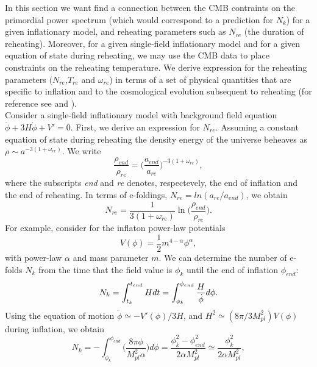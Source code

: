 \documentclass[11pt,a4paper,twoside]{book}
\begin{document}
In this section we want find a connection between the CMB contraints on the primordial power spectrum (which would correspond to a prediction for $ N_{k} $) for a given inflationary model, and reheating parameters such as $ N_{re} $ (the duration of reheating). Moreover, for a given single-field inflationary model and for a given equation of state during reheating, we may use the CMB data to place constraints on the reheating temperature. We derive expression for the reheating parameters $ (N_{re}$,$T_{re}$ and $ \omega_{re} $) in terms of a set of physical quantities that are specific to inflation and to the cosmological evolution subsequent to reheating (for reference see \cite{Chap3:Cook} and \cite{Chap3:Kai_Kamionkowsy}).\\
 Consider a single-field inflationary model with background field equation $ \ddot{\phi}+3H\dot{\phi} + V'=0 $. First, we derive an expression for $ N_{re} $. Assuming a constant equation of state during reheating  the density energy of the universe beheaves as $ \rho \sim a^{-3(1+\omega_{re})} $. We write
\begin{equation}
	\label{Chap3:DensityEnergyBeheaviour}
	\frac{\rho_{end}}{\rho_{re}}=\Bigg( \frac{a_{end}}{a_{re}}\Bigg)^{-3(1+\omega_{re})},
\end{equation}
where the subscripts \textit{end} and \textit{re} denotes, respectevely, the end of inflation and the end of reheating. In terms of e-foldings, $ N_{re}=ln(a_{re}/a_{end}) $, we obtain
\begin{equation}
	\label{Chap3:Nre}
	N_{re}=\frac{1}{3(1+\omega_{re})}\ln\Bigg(\frac{\rho_{end}}{\rho_{re}}\Bigg).
\end{equation}
For example,  consider for the inflaton power-law potentials
\begin{equation}
	\label{Chap3:potentialInflation}
	V(\phi)=\frac{1}{2}m^{4-\alpha}\phi^{\alpha},
\end{equation}
with power-law $\alpha$ and mass parameter $ m $. We can determine the number of e-folds $ N_{k} $ from the time that the field value is $\phi_{k}$ until the end of inflation $ \phi_{end} $: 
\begin{equation}
	\label{Chap3:N_{k}}
	N_{k}=\int_{t_{k}}^{t_{end}} H dt = \int_{\phi_{k}}^{\phi_{end}}\frac{H}{\dot{\phi}}d\phi.
\end{equation}
Using the equation of motion  $\dot{\phi} \simeq -V'(\phi)/3H $, and $ H^{2}\simeq (8\pi /3M_{pl}^{2})V(\phi) $ during inflation, we obtain
\begin{equation}
	\label{Chap3:eFolds}
	N_{k}=-\int_{\phi_{k}}^{\phi_{end}}\Bigg(\frac{8\pi \phi}{M_{pl}^{2}\alpha}\Bigg)d\phi = \frac{\phi^{2}_{k} - \phi^{2}_{end}}{2\alpha M_{pl}^{2}} \simeq \frac{\phi_{k}^{2}}{2\alpha M_{pl}^{2}},
\end{equation}
\end{document}
